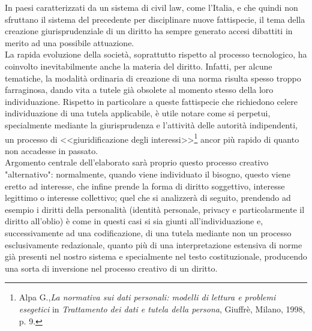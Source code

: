 In paesi caratterizzati da un sistema di civil law, come l'Italia, e che quindi non sfruttano il sistema del precedente per disciplinare nuove fattispecie, il tema della creazione giurisprudenziale di un diritto ha sempre generato accesi dibattiti in merito ad una possibile attuazione.
\\La rapida evoluzione della società, soprattutto rispetto al processo tecnologico, ha coinvolto inevitabilmente anche la materia del diritto. Infatti, per alcune tematiche, la modalità ordinaria di creazione di una norma risulta spesso troppo farraginosa, dando vita a tutele già obsolete al momento stesso della loro individuazione. Rispetto in particolare a queste fattispecie che richiedono celere individuazione di una tutela applicabile, è utile notare come si perpetui, specialmente mediante la giurisprudenza e l'attività delle autorità indipendenti, un processo di <<giuridificazione degli interessi>>\footnote{Alpa G.,\textit{La normativa sui dati personali: modelli di lettura e problemi esegetici} in \textit{Trattamento dei dati e tutela della persona}, Giuffrè, Milano, 1998, p. 9.} ancor più rapido di quanto non accadesse in passato.
\\Argomento centrale dell'elaborato sarà proprio questo processo creativo "alternativo": normalmente, quando viene individuato il bisogno, questo viene eretto ad interesse, che infine prende la forma di diritto soggettivo, interesse legittimo o interesse collettivo; quel che si analizzerà di seguito, prendendo ad esempio i diritti della personalità (identità personale, privacy e particolarmente il diritto all'oblio) è come in questi casi si sia giunti all'individuazione e, successivamente ad una codificazione, di una tutela mediante non un processo esclusivamente redazionale, quanto più di una interpretazione estensiva di norme già presenti nel nostro sistema e specialmente nel testo costituzionale, producendo una sorta di inversione nel processo creativo di un diritto.

